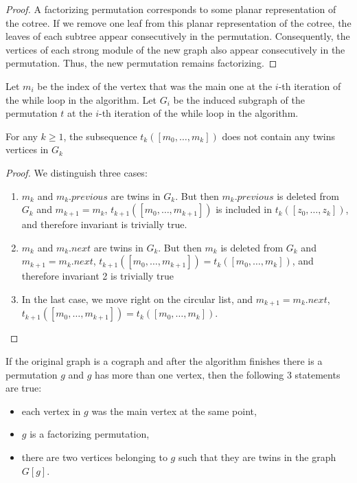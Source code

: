 \begin{proof}
A factorizing permutation corresponds to some planar representation of the cotree. If we remove one leaf from this planar representation of the cotree, the leaves of each subtree appear consecutively in the permutation. Consequently, the vertices of each strong module of the new graph also appear consecutively in the permutation. Thus, the new permutation remains factorizing.
\end{proof}

Let $m_i$ be the index of the vertex that was the main one at the $i$-th iteration of the while loop in the algorithm. Let $G_i$ be the induced subgraph of the permutation $t$ at the $i$-th iteration of the while loop in the algorithm.

\begin{invariant}
    For any $k \ge 1$, the subsequence $t_k([m_0, \dots, m_k])$ does not contain any twins vertices in $G_k$ 
\end{invariant}

\begin{proof}
We distinguish three cases:
\begin{enumerate}
    \item $m_k$ and $m_k.previous$ are twins in $G_k$. But then $m_k.previous$ is deleted from $G_k$ and $m_{k+1} = m_k$, $t_{k+1}([m_0,\dots ,m_{k+1}])$ is included in
$t_{k}([z_0,\dots ,z_k])$, and therefore invariant is trivially true.
    \item $m_k$ and $m_k.next$ are twins in $G_k$. But then $m_k$ is deleted from $G_k$ and $m_{k+1} = m_k.next$, $t_{k+1}([m_0, \dots,m_{k+1}]) = t_{k}([m_0,\dots, m_k])$,
and therefore invariant 2 is trivially true
    \item  In the last case, we move right on the circular list, and $m_{k+1} = m_k.next$, $t_{k+1}([m_0,\dots,m_{k+1}]) = t_k([m_0,\dots,m_k])$.
\end{enumerate} 
\end{proof}

If the original graph is a cograph and after the algorithm finishes there is a permutation $g$ and $g$ has more than one vertex, then the following 3 statements are true:
\begin{itemize}
    \item each vertex in $g$ was the main vertex at the same point,
    \item $g$ is a factorizing permutation,
    \item there are two vertices belonging to $g$ such that they are twins in the graph $G[g]$.
\end{itemize}

